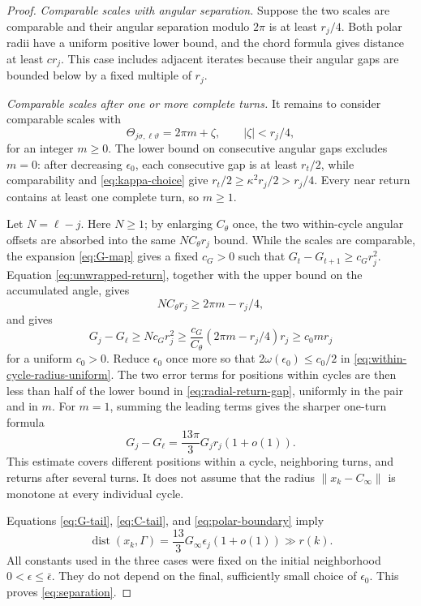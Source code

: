 \documentclass[11pt]{article}
\begin{document}
\begin{proof}
\emph{Comparable scales with angular separation.}  Suppose the two scales
are comparable and their angular separation modulo $2\pi$ is at least
$r_j/4$.
Both polar radii have a uniform positive
lower bound, and the chord formula gives distance at least $c r_j$.
This case includes adjacent iterates because their angular gaps are bounded
below by a fixed multiple of $r_j$.

\emph{Comparable scales after one or more complete turns.}  It remains to consider
comparable scales with
\begin{equation}\label{eq:unwrapped-return}
\Theta_{j\sigma,\ell\vartheta}=2\pi m+\zeta,
\qquad |\zeta|<r_j/4,
\end{equation}
for an integer $m\ge0$.  The lower bound on consecutive
angular gaps excludes $m=0$: after decreasing $\epsilon_0$, each consecutive
gap is at least $r_t/2$, while comparability and
\eqref{eq:kappa-choice} give
$r_t/2\ge\kappa^2r_j/2>r_j/4$.  Every near return contains at least
one complete turn, so $m\ge1$.

Let $N=\ell-j$.  Here $N\ge1$; by enlarging $C_\theta$ once, the two
within-cycle angular offsets are absorbed into the same $NC_\theta r_j$
bound.  While the scales are comparable, the expansion
\eqref{eq:G-map} gives a fixed $c_G>0$ such that
$G_t-G_{t+1}\ge c_G r_j^2$.  Equation
\eqref{eq:unwrapped-return}, together with the upper bound on the accumulated
angle, gives
\begin{equation}\label{eq:cycle-count}
NC_\theta r_j\ge 2\pi m-r_j/4,
\end{equation}
and gives
\begin{equation}\label{eq:radial-return-gap}
G_j-G_\ell
\ge Nc_G r_j^2
\ge \frac{c_G}{C_\theta}(2\pi m-r_j/4)r_j
\ge c_0m r_j
\end{equation}
for a uniform $c_0>0$.  Reduce $\epsilon_0$ once more so that
$2\omega(\epsilon_0)\le c_0/2$ in
\eqref{eq:within-cycle-radius-uniform}.  The two error terms for positions
within cycles are then less than half of the lower bound in
\eqref{eq:radial-return-gap}, uniformly in the pair and in $m$.  For $m=1$,
summing the leading terms gives the
sharper one-turn
formula
\begin{equation}\label{eq:one-turn-drop}
G_j-G_\ell=\frac{13\pi}{3}G_jr_j(1+o(1)).
\end{equation}
This estimate covers different positions within a cycle, neighboring turns,
and returns after several turns.  It does not assume that the radius
$\|x_k-C_\infty\|$ is monotone at every individual cycle.

Equations \eqref{eq:G-tail}, \eqref{eq:C-tail}, and
\eqref{eq:polar-boundary} imply
\[
\operatorname{dist}(x_k,\Gamma)
=\frac{13}{3}G_\infty\epsilon_j(1+o(1))\gg r(k).
\]
All constants used in the three cases were fixed on the initial neighborhood
$0<\epsilon\le\bar\epsilon$.  They do not depend on the final, sufficiently
small choice of $\epsilon_0$.  This proves
\eqref{eq:separation}.
\end{proof}
\end{document}
